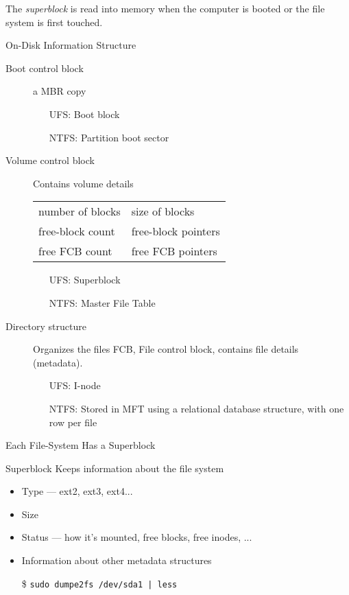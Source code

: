 The \emph{superblock} is read into memory when the computer is booted or the file system
is first touched.

\begin{frame}{On-Disk Information Structure}
  \begin{description}
  \item[Boot control block] a MBR copy
    \begin{itemize}
    \item[UFS:] Boot block
    \item[NTFS:] Partition boot sector
    \end{itemize}
  \item[Volume control block] Contains volume details
    \begin{center}
      \begin{tabular}{ll}
        number of blocks& size of blocks\\
        free-block count& free-block pointers\\
        free FCB count& free FCB pointers
      \end{tabular}
    \end{center}
    \begin{itemize}
    \item[UFS:] Superblock
    \item[NTFS:] Master File Table
    \end{itemize}
  \item[Directory structure] Organizes the files \alert{FCB}, \alert{File control block},
    contains file details (metadata).
    \begin{itemize}
    \item[UFS:] I-node
    \item[NTFS:] Stored in MFT using a relational database structure, with one row per
      file
    \end{itemize}
  \end{description}
\end{frame}

\begin{frame}{Each File-System Has a Superblock}
  \begin{block}{Superblock}
    Keeps information about the file system
    \begin{itemize}
    \item Type --- ext2, ext3, ext4...
    \item Size
    \item Status --- how it's mounted, free blocks, free inodes, ...
    \item Information about other metadata structures
    \end{itemize}
  \end{block}
  \begin{itemize}
  \item[\$] \texttt{sudo dumpe2fs /dev/sda1 | less}
  \end{itemize}
\end{frame}

